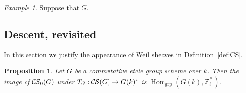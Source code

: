 \documentclass[10pt]{amsart}
\theoremstyle{plain}
\newtheorem{proposition}[theorem]{Proposition}
\theoremstyle{definition}
\theoremstyle{remark}
\newtheorem{example}[theorem]{Example}
\newcommand{\Fq}{k}
\newcommand{\ZEx}{\mathbb{\bar Z}_\ell^\times}
\DeclareMathOperator{\Hom}{Hom}
\newcommand{\TrFrob}[1]{T_{#1}}
\newcommand{\CS}{{\mathcal{C\hskip-0.8pt S}}}
\newcommand{\bCS}{{\CS_0}}
\newcommand{\bG}{\bar{G}}
\begin{document}
\begin{example} \label{eg:H2}
Suppose that $\bG$.
\end{example}

\subsection{Descent, revisited}\label{ssec:bS}

In this section we justify the appearance of Weil sheaves in Definition~\ref{def:CS}.

\begin{proposition}\label{prop:bounded-etale}
Let $G$ be a commutative etale group scheme over $\Fq$.
Then the image of $\bCS(G)$ under $\TrFrob{G} : \CS(G) \to G(\Fq)^*$ is $\Hom_\text{grp}(G(\Fq),\ZEx)$.
\end{proposition}
\end{document}
